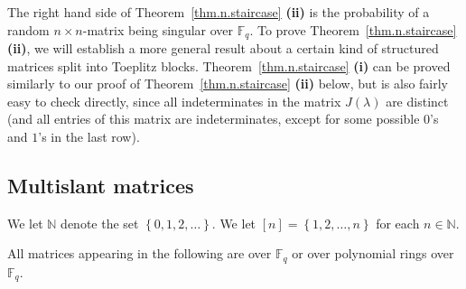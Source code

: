 \documentclass[numbers=enddot,12pt,final,onecolumn,notitlepage]{scrartcl}%
\theoremstyle{definition}
\newenvironment{noncompile}{}{}
\newcommand{\tup}[1]{\left( #1 \right)}
\newcommand{\Fq}{\mathbb{F}_q}
\theoremstyle{plainsl}
\begin{document}
The right hand side of Theorem~\ref{thm.n.staircase} \textbf{(ii)}
is the probability of a random $n\times n$-matrix being singular over $\mathbb{F}_q$.
To prove Theorem~\ref{thm.n.staircase} \textbf{(ii)}, we will establish a more general result about a certain kind of structured matrices split into Toeplitz blocks.
Theorem~\ref{thm.n.staircase} \textbf{(i)} can be proved similarly to our proof of Theorem~\ref{thm.n.staircase} \textbf{(ii)} below,
but is also fairly easy to check directly, since all indeterminates
in the matrix $J\tup{\lambda}$ are distinct (and all entries of this
matrix are indeterminates, except for some possible $0$'s and $1$'s
in the last row).



\subsection{Multislant matrices}

We let $\mathbb{N}$ denote the set $\left\{  0,1,2,\ldots\right\}  $. We let
$\left[  n\right]  =\left\{  1,2,\ldots,n\right\}  $ for each $n\in\mathbb{N}$.

All matrices appearing in the following are over $\Fq$ or over
polynomial rings over $\Fq$.

\end{document}
